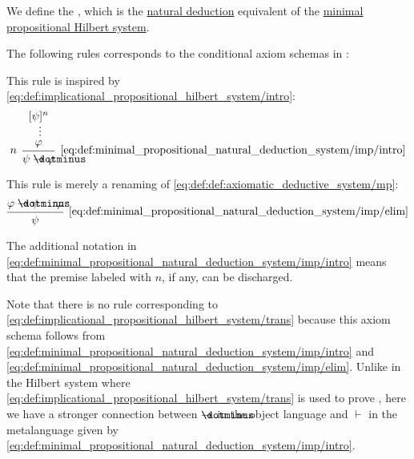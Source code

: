 \begin{definition}\label{def:minimal_propositional_natural_deduction_system}
  We define the , which is the \hyperref[def:natural_deduction_system]{natural deduction} equivalent of the \hyperref[def:minimal_propositional_hilbert_system]{minimal propositional Hilbert system}.

  \begin{thmenum}
     The following rules corresponds to the conditional axiom schemas in :

    \begin{minipage}[t]{0.45\textwidth}
      This rule is inspired by \eqref{eq:def:implicational_propositional_hilbert_system/intro}:
      \begin{equation*}\taglabel[\( \rightarrow^+ \)]{eq:def:minimal_propositional_natural_deduction_system/imp/intro}
        \begin{prooftree}
          \hypo{ [\psi]^n }
          \ellipsis {} { \varphi }
          \infer[left label=\( n \)]1[\ref{eq:def:minimal_propositional_natural_deduction_system/imp/intro}]{ \psi \synimplies \varphi }
        \end{prooftree}
      \end{equation*}
    \end{minipage}
    \hfill
    \begin{minipage}[t]{0.45\textwidth}
      This rule is merely a renaming of \eqref{eq:def:def:axiomatic_deductive_system/mp}:
      \begin{equation*}\taglabel[\( \rightarrow^- \)]{eq:def:minimal_propositional_natural_deduction_system/imp/elim}
        \begin{prooftree}
          \hypo{ \varphi \synimplies \psi }
          \hypo{ \varphi }
          \infer2[\ref{eq:def:minimal_propositional_natural_deduction_system/imp/elim}]{ \psi }
        \end{prooftree}
      \end{equation*}
    \end{minipage}

    The additional notation in \eqref{eq:def:minimal_propositional_natural_deduction_system/imp/intro} means that the premise labeled with \( n \), if any, can be discharged.

    Note that there is no rule corresponding to \eqref{eq:def:implicational_propositional_hilbert_system/trans} because this axiom schema follows from \eqref{eq:def:minimal_propositional_natural_deduction_system/imp/intro} and \eqref{eq:def:minimal_propositional_natural_deduction_system/imp/elim}. Unlike in the Hilbert system where \eqref{eq:def:implicational_propositional_hilbert_system/trans} is used to prove , here we have a stronger connection between \( \synimplies \) in the object language and \( \vdash \) in the metalanguage given by \eqref{eq:def:minimal_propositional_natural_deduction_system/imp/intro}.


\end{thmenum}
\end{definition}
